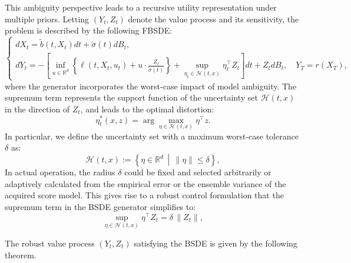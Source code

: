 \documentclass[11pt]{article}
\def\w{\widetilde}
\begin{document}
This ambiguity perspective leads to a recursive utility representation under multiple priors. Letting $(Y_t, Z_t)$ denote the value process and its sensitivity, the problem is described by the following FBSDE:
\begin{equation}
\begin{cases}
    dX_t =\w b(t,X_t)dt + \w\sigma(t) dB_t, \\
    dY_t = - \left[ \inf_{u \in \mathbb{R}^d} \left\{ \ell(t,X_t,u_t) + u \cdot \frac{Z_t}{\w\sigma(t)} \right\} + \sup_{\eta_t \in \mathcal{H}(t,x)} \eta_t^\top Z_t \right] dt + Z_t dB_t, \quad Y_T = r(X_T),
\end{cases}
\end{equation}
where the generator incorporates the worst-case impact of model ambiguity. The supremum term represents the support function of the uncertainty set $\mathcal{H}(t,x)$ in the direction of $Z_t$, and leads to the optimal distortion:
\begin{equation}
    \eta_t^*(x,z) = \arg\max_{\eta \in \mathcal{H}(t,x)} \eta^\top z.
\end{equation}
In particular, we define the uncertainty set with a maximum worst-case tolerance $\delta$ as:
\begin{equation}
    \mathcal{H}(t,x) := \left\{ \eta \in \mathbb{R}^d \,\middle|\, \|\eta\| \leq \delta \right\},
\end{equation}
In actual operation, the radius $\delta$ could be fixed and selected arbitrarily or adaptively calculated from the empirical error or the ensemble variance of the acquired score model. This gives rise to a robust control formulation that the supremum term in the BSDE generator simplifies to:
\begin{equation}
    \sup_{\eta \in \mathcal{H}(t,x)} \eta^\top Z_t = \delta\, \|Z_t\|,
\end{equation}

The robust value process $(Y_t, Z_t)$ satisfying the BSDE is given by the following theorem.
\end{document}
